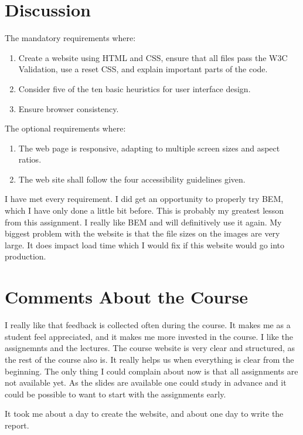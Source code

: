 \documentclass[a4paper]{scrartcl}
\begin{document}
\section{Discussion}

The mandatory requirements where:
\begin{enumerate}
	\item Create a website using HTML and CSS, ensure that all files pass the W3C Validation, use a reset CSS, and explain important parts of the code.
	\item Consider five of the ten basic heuristics for user interface design.
	\item Ensure browser consistency.
\end{enumerate}

The optional requirements where:
\begin{enumerate}
	\item The web page is responsive, adapting to multiple screen sizes and aspect ratios.
	\item The web site shall follow the four accessibility guidelines given.
\end{enumerate}


\noindent
I have met every requirement. I did get an opportunity to properly try BEM, which I have only done a little bit before. This is probably my greatest lesson from this assignment. I really like BEM and will definitively use it again. My biggest problem with the website is that the file sizes on the images are very large. It does impact load time which I would fix if this website would go into production.

\section{Comments About the Course}

I really like that feedback is collected often during the course. It makes me as a student feel appreciated, and it makes me more invested in the course. I like the assignemnts and the lectures. The course website is very clear and structured, as the rest of the course also is. It really helps us when everything is clear from the beginning. The only thing I could complain about now is that all assignments are not available yet. As the slides are available one could study in advance and it could be possible to want to start with the assignments early.

It took me about a day to create the website, and about one day to write the report.

\printbibliography[heading=bibintoc]
\end{document}
